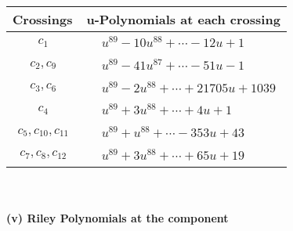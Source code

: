 \documentclass[1p]{elsarticle_modified}
\theoremstyle{definition}
\begin{document}
\begin{tabular}{m{50pt}|m{274pt}}
Crossings & \hspace{64pt}u-Polynomials at each crossing \\
\hline $$\begin{aligned}c_{1}\end{aligned}$$&$\begin{aligned}
&u^{89}-10 u^{88}+\cdots-12 u+1
\end{aligned}$\\
\hline $$\begin{aligned}c_{2},c_{9}\end{aligned}$$&$\begin{aligned}
&u^{89}-41 u^{87}+\cdots-51 u-1
\end{aligned}$\\
\hline $$\begin{aligned}c_{3},c_{6}\end{aligned}$$&$\begin{aligned}
&u^{89}-2 u^{88}+\cdots+21705 u+1039
\end{aligned}$\\
\hline $$\begin{aligned}c_{4}\end{aligned}$$&$\begin{aligned}
&u^{89}+3 u^{88}+\cdots+4 u+1
\end{aligned}$\\
\hline $$\begin{aligned}c_{5},c_{10},c_{11}\end{aligned}$$&$\begin{aligned}
&u^{89}+u^{88}+\cdots-353 u+43
\end{aligned}$\\
\hline $$\begin{aligned}c_{7},c_{8},c_{12}\end{aligned}$$&$\begin{aligned}
&u^{89}+3 u^{88}+\cdots+65 u+19
\end{aligned}$\\
\hline
\end{tabular}\\~\\
\newpage\renewcommand{\arraystretch}{1}
\flushleft \textbf{(v) Riley Polynomials at the component}\newline \\
\end{document}
